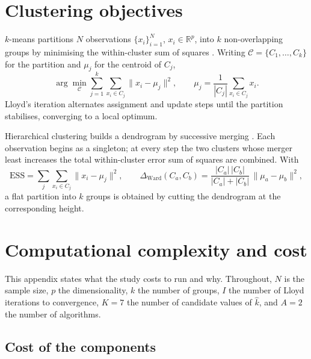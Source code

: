 \documentclass[pdflatex,sn-basic]{sn-jnl}
\providecommand{\DIFaddend}{} %
\DeclareRobustCommand{\DIFaddend}{\DIFOaddend \let\includegraphics\DIFOincludegraphics} %
\begin{document}
\DIFaddend \begin{appendices}

\section{Clustering objectives}
\label{app:algorithms}

$k$-means partitions $N$ observations $\{x_i\}_{i=1}^N$, $x_i \in
\mathbb{R}^p$, into $k$ non-overlapping groups by minimising the within-cluster
sum of squares \citep{macqueen1967}. Writing $\mathcal{C} = \{C_1,\dots,C_k\}$
for the partition and $\mu_j$ for the centroid of $C_j$,
\begin{equation}
  \arg\min_{\mathcal{C}} \sum_{j=1}^{k} \sum_{x_i \in C_j}
    \lVert x_i - \mu_j \rVert^2,
  \qquad
  \mu_j = \frac{1}{|C_j|}\sum_{x_i \in C_j} x_i .
  \label{eq:wcss}
\end{equation}
Lloyd's iteration alternates assignment and update steps until the partition
stabilises, converging to a local optimum.

Hierarchical clustering builds a dendrogram by successive merging
\citep{ward1963}. Each observation begins as a singleton; at every step the two
clusters whose merger least increases the total within-cluster error sum of
squares are combined. With
\begin{equation}
  \mathrm{ESS} = \sum_j \sum_{x_i \in C_j} \lVert x_i - \mu_j \rVert^2,
  \qquad
  \Delta_{\text{Ward}}(C_a, C_b)
    = \frac{|C_a|\,|C_b|}{|C_a| + |C_b|}\,
      \lVert \mu_a - \mu_b \rVert^2 ,
  \label{eq:ward}
\end{equation}
a flat partition into $k$ groups is obtained by cutting the dendrogram at the
corresponding height.

\section{Computational complexity and cost}
\label{app:complexity}

This appendix states what the study costs to run and why. Throughout, $N$ is the
sample size, $p$ the dimensionality, $k$ the number of groups, $I$ the number of
Lloyd iterations to convergence, $K = 7$ the number of candidate values of
$\hat{k}$, and $A = 2$ the number of algorithms.

\subsection{Cost of the components}


\end{appendices}
\end{document}
